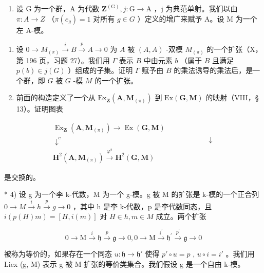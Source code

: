 \begin{enumerate}
\def\labelenumi{\arabic{enumi})}
\setcounter{enumi}{2}
\tightlist
\item
  设 G 为一个群，A 为代数 \(\mathbf{Z}^{(\mathrm{G})}, j: \mathrm{G} \to \mathrm{A}\) ，j 为典范单射。我们以由 \(\pi: A \to Z\) （\(\pi(e_g) = 1\) 对所有 \(g \in G\) ）定义的增广来赋予 A。设 M 为一个左 A-模。
\end{enumerate}

\begin{enumerate}
\def\labelenumi{\alph{enumi})}
\item
  设 \(0 \to M_{(\pi)} \xrightarrow{i} B \xrightarrow{p} A \to 0\) 为 \(A\) 被 \((A, A)\) -双模 \(M_{(\pi)}\) 的一个扩张（X，第 196 页，习题 27）。我们用 \(\Gamma\) 表示 \(B\) 中由元素 \(b\) （属于 \(B\) 且满足 \(p(b) \in j(G)\) ）组成的子集。证明 \(\Gamma\) 赋予由 \(B\) 的乘法诱导的乘法后，是一个群，即 \(G\) 被 \(G\) -模 \(M\) 的一个扩张。
\item
前面的构造定义了一个从 \(\mathrm{Ex}_{\mathbf{Z}}(\mathbf{A},\mathbf{M}_{(\pi)})\) 到 \(\mathrm{Ex}(\mathbf{G},\mathbf{M})\) 的映射（VIII，§ 13）。证明图表
\end{enumerate}

\[
\begin{array}{c} \operatorname{Ex} _ {\mathbf {Z}} (\mathbf {A}, \mathbf {M} _ {(\pi)}) \to \operatorname{Ex} (\mathbf {G}, \mathbf {M}) \\ \downarrow^ {c} \qquad \qquad \qquad \qquad \qquad \qquad \qquad \qquad \qquad \qquad \downarrow \\ \mathbf {H} ^ {2} (\mathbf {A}, \mathbf {M} _ {(\pi)}) \xrightarrow {\varphi^ {2}} \mathbf {H} ^ {2} (\mathbf {G}, \mathbf {M}) \end{array}
\]

是交换的。

* 4) 设 g 为一个李 k-代数，M 为一个 g-模。g 被 M 的扩张是 k-模的一个正合列 \(0 \rightarrow M \xrightarrow{i} h \xrightarrow{p} g \rightarrow 0\) ，其中 h 是李 k-代数，p 是李代数同态，且 \(i(p(H)m) = [H, i(m)]\) 对 \(H \in h, m \in M\) 成立。两个扩张

\[
0 \rightarrow \mathrm{M} \stackrel {i} {\rightarrow} \mathfrak {h} \stackrel {p} {\rightarrow} \mathfrak {g} \rightarrow 0, 0 \rightarrow \mathrm{M} \stackrel {i ^ {\prime}} {\rightarrow} \mathfrak {h} ^ {\prime} \stackrel {p ^ {\prime}} {\rightarrow} \mathfrak {g} \rightarrow 0
\]

被称为等价的，如果存在一个同态 \(u: \mathfrak{h} \to \mathfrak{h}'\) 使得 \(p' \circ u = p\) , \(u \circ i = i'\) 。我们用 Liex (g, M) 表示 g 被 M 扩张的等价类集合。我们假设 g 是一个自由 k-模。

